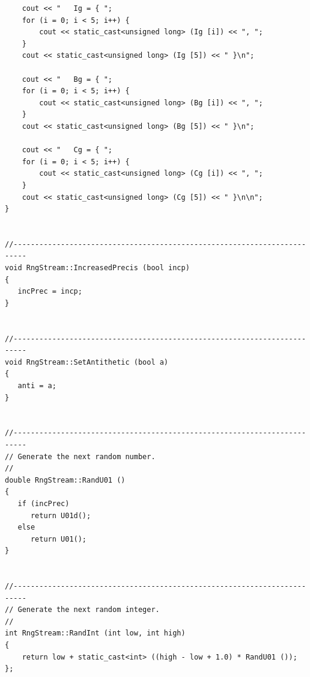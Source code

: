 \documentclass[12pt]{article}
\begin{document}
\begin{verbatim}
    cout << "   Ig = { ";
    for (i = 0; i < 5; i++) {
        cout << static_cast<unsigned long> (Ig [i]) << ", ";
    }
    cout << static_cast<unsigned long> (Ig [5]) << " }\n";

    cout << "   Bg = { ";
    for (i = 0; i < 5; i++) {
        cout << static_cast<unsigned long> (Bg [i]) << ", ";
    }
    cout << static_cast<unsigned long> (Bg [5]) << " }\n";

    cout << "   Cg = { ";
    for (i = 0; i < 5; i++) {
        cout << static_cast<unsigned long> (Cg [i]) << ", ";
    }
    cout << static_cast<unsigned long> (Cg [5]) << " }\n\n";
}


//-------------------------------------------------------------------------
void RngStream::IncreasedPrecis (bool incp)
{
   incPrec = incp;
}


//-------------------------------------------------------------------------
void RngStream::SetAntithetic (bool a)
{
   anti = a;
}


//-------------------------------------------------------------------------
// Generate the next random number.
//
double RngStream::RandU01 ()
{
   if (incPrec)
      return U01d();
   else
      return U01();
}


//-------------------------------------------------------------------------
// Generate the next random integer.
//
int RngStream::RandInt (int low, int high)
{
    return low + static_cast<int> ((high - low + 1.0) * RandU01 ());
};

\end{verbatim}
\fi  %
\end{document}

